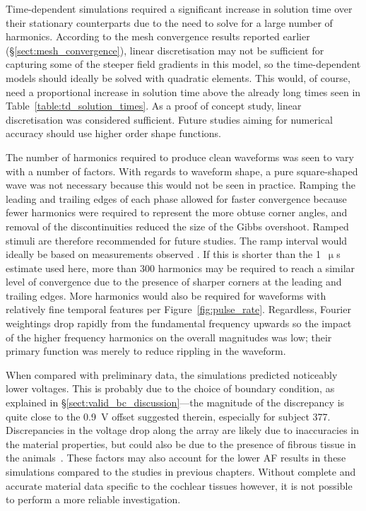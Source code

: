 Time-dependent simulations required a significant increase in solution time over
their stationary counterparts due to the need to solve for a large number of
harmonics. According to the mesh convergence results reported earlier
(\S\ref{sect:mesh_convergence}), linear discretisation may not be sufficient for
capturing some of the steeper field gradients in this model, so the
time-dependent models should ideally be solved with quadratic elements. This
would, of course, need a proportional increase in solution time above the
already long times seen in Table~\ref{table:td_solution_times}. As a proof of
concept study, linear discretisation was considered sufficient. Future studies
aiming for numerical accuracy should use higher order shape functions.

The number of harmonics required to produce clean waveforms was seen to vary
with a number of factors. With regards to waveform shape, a pure square-shaped
wave was not necessary because this would not be seen in practice. Ramping the
leading and trailing edges of each phase allowed for faster convergence because
fewer harmonics were required to represent the more obtuse corner angles, and
removal of the discontinuities reduced the size of the Gibbs overshoot. Ramped
stimuli are therefore recommended for future studies. The ramp interval would
ideally be based on measurements observed \invivo{}. If this is shorter than the
1~$ \upmu $s estimate used here, more than 300 harmonics may be required to
reach a similar level of convergence due to the presence of sharper corners at
the leading and trailing edges. More harmonics would also be required for
waveforms with relatively fine temporal features per
Figure~\ref{fig:pulse_rate}. Regardless, Fourier weightings drop rapidly from
the fundamental frequency upwards so the impact of the higher frequency
harmonics on the overall magnitudes was low; their primary function was merely
to reduce rippling in the waveform.

When compared with preliminary \invivo{} data, the simulations predicted
noticeably lower voltages. This is probably due to the choice of boundary
condition, as explained in \S\ref{sect:valid_bc_discussion}---the magnitude of
the discrepancy is quite close to the 0.9~V offset suggested therein, especially
for subject 377. Discrepancies in the voltage drop along the array are likely
due to inaccuracies in the material properties, but could also be due to the
presence of fibrous tissue in the animals~\cite{hanekom2005}. These factors may
also account for the lower AF results in these simulations compared to the
studies in previous chapters. Without complete and accurate material data
specific to the cochlear tissues however, it is not possible to perform a more
reliable investigation.


